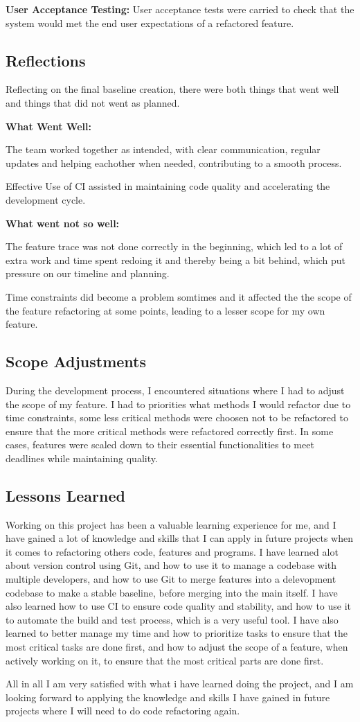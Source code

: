 \textbf{User Acceptance Testing:} User acceptance tests were carried to check that the system would met the end user expectations of a refactored feature.

\subsection{Reflections}

Reflecting on the final baseline creation, there were both things that went well and things that did not went as planned.

\textbf{What Went Well:}

The team worked together as intended, with clear communication, regular updates and helping eachother when needed, contributing to a smooth process.

Effective Use of CI assisted in maintaining code quality and accelerating the development cycle.

\textbf{What went not so well:}

The feature trace was not done correctly in the beginning, which led to a lot of extra work and time spent redoing it and thereby being a bit behind, which put pressure on
our timeline and planning.

Time constraints did become a problem somtimes and it affected the the scope of the feature refactoring at some points, leading to a lesser scope for my own feature.

\subsection{Scope Adjustments}

During the development process, I encountered situations where I had to adjust the scope of my feature. I had to priorities what methods I would refactor
due to time constraints, some less critical methods were choosen not to be refactored to ensure that the more critical methods were refactored correctly first.
In some cases, features were scaled down to their essential functionalities to meet deadlines while maintaining quality.

\subsection{Lessons Learned}

Working on this project has been a valuable learning experience for me, and I have gained a lot of knowledge and skills that I can apply in future projects when it comes
to refactoring others code, features and programs. I have learned alot about version control using Git, and how to use it to manage a codebase with multiple developers,
and how to use Git to merge features into a delevopment codebase to make a stable baseline, before merging into the main itself.
I have also learned how to use CI to ensure code quality and stability, and how to use it to automate the build and test process, which is a very useful tool.
I have also learned to better manage my time and how to prioritize tasks to ensure that the most critical tasks are done first, and how to adjust the scope of a feature,
when actively working on it, to ensure that the most critical parts are done first.

All in all I am very satisfied with what i have learned doing the project, and I am looking forward to applying the knowledge and skills
I have gained in future projects where I will need to do code refactoring again.
